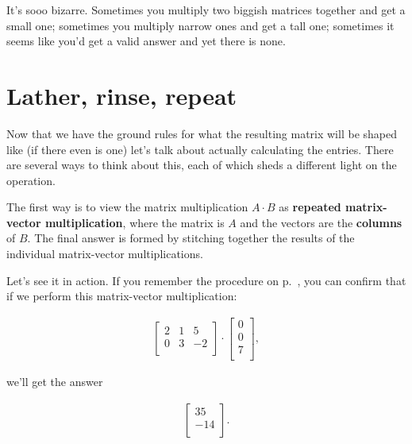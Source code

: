 It's sooo bizarre. Sometimes you multiply two biggish matrices together and get
a small one; sometimes you multiply narrow ones and get a tall one; sometimes
it seems like you'd get a valid answer and yet there is none.

\section{Lather, rinse, repeat}

Now that we have the ground rules for what the resulting matrix will be shaped
like (if there even is one) let's talk about actually calculating the entries.
There are several ways to think about this, each of which sheds a different
light on the operation.


The first way is to view the matrix multiplication $A \cdot B$ as
\textbf{repeated matrix-vector multiplication}, where the matrix is $A$ and the
vectors are the \textbf{columns} of $B$. The final answer is formed by
stitching together the results of the individual matrix-vector multiplications.

Let's see it in action. If you remember the procedure on
p.~\pageref{matrixVectorMultiplication}, you can confirm that if we perform
this matrix-vector multiplication:

\vspace{-.15in}
\begin{align*}
\begin{bmatrix}
2 & 1 & 5 \\
0 & 3 & -2 \\
\end{bmatrix} \cdot
\begin{bmatrix}
0 \\ 0 \\ 7 \\
\end{bmatrix},
\end{align*}
\vspace{-.15in}

we'll get the answer

\vspace{-.15in}
\begin{align*}
\begin{bmatrix}
35 \\ -14 \\
\end{bmatrix}.
\end{align*}
\vspace{-.15in}

